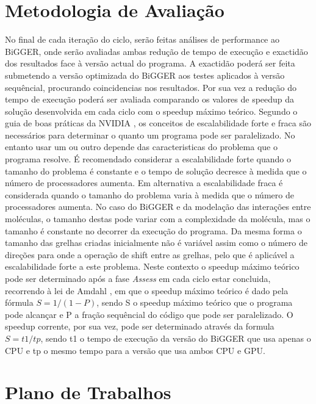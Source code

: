\section{Metodologia de Avaliação}
No final de cada iteração do ciclo, serão feitas análises de performance ao BiGGER, onde serão avaliadas ambas redução de tempo de execução e exactidão dos resultados face à versão actual do programa.
A exactidão poderá ser feita submetendo a versão optimizada do BiGGER aos testes aplicados à versão sequêncial, procurando coincidencias nos resultados. Por sua vez a redução do tempo de execução poderá ser avaliada comparando os valores de speedup da solução desenvolvida em cada ciclo com o speedup máximo teórico. Segundo o guia de boas práticas da NVIDIA \cite{cudaProgGuide},  os conceitos de escalabilidade forte e fraca são necessários para determinar o quanto um programa pode ser paralelizado. No entanto usar um ou outro depende das caracteristicas do problema que o programa resolve. É recomendado considerar a escalabilidade forte quando o tamanho do problema é constante e o tempo de solução decresce à medida que o número de processadores aumenta. Em alternativa a escalabilidade fraca é considerada quando o tamanho do problema varia à medida que o número de processadores aumenta. No caso do BiGGER e da modelação das interações entre moléculas, o tamanho destas pode variar com a complexidade da molécula, mas o tamanho é constante no decorrer da execução do programa. Da mesma forma o tamanho das grelhas criadas inicialmente não é variável assim como o número de direções para onde a operação de shift entre as grelhas, pelo que é aplicável a escalabilidade forte a este problema. Neste contexto o speedup máximo teórico pode ser determinado após a fase \textit{Assess} em cada ciclo estar concluida, recorrendo à lei de Amdahl \cite{amdahl1967}, em que o speedup máximo teórico é dado pela fórmula $ S = 1 / ( 1 - P )$, sendo S o speedup máximo teórico que o programa pode alcançar e P a fração sequêncial do código que pode ser paralelizado. O speedup corrente, por sua vez, pode ser determinado através da formula $ S = t1/ tp$, sendo t1 o tempo de execução da versão do BiGGER que usa apenas o CPU e tp o mesmo tempo para a versão que usa ambos CPU e GPU.
\section{Plano de Trabalhos} %
\label{sec:dealing_with_bibliogrpahy}
% 


